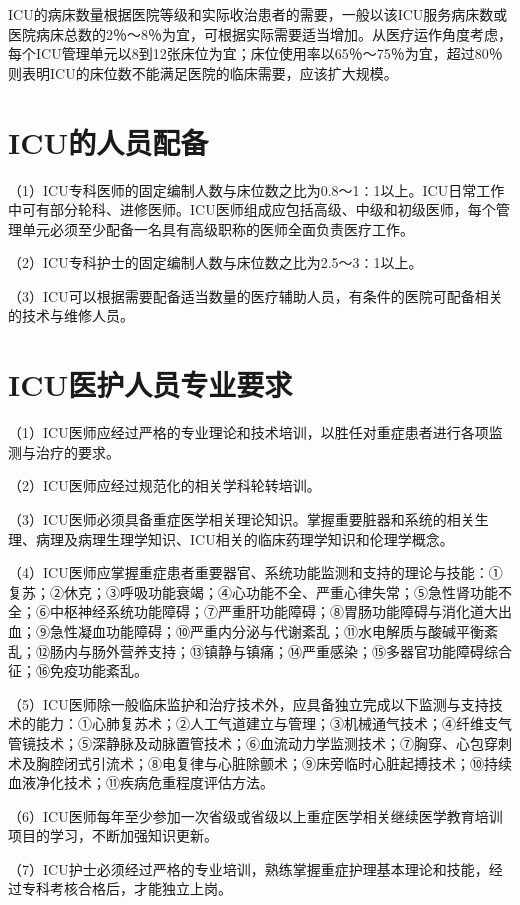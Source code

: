 ICU的病床数量根据医院等级和实际收治患者的需要，一般以该ICU服务病床数或医院病床总数的2％～8％为宜，可根据实际需要适当增加。从医疗运作角度考虑，每个ICU管理单元以8到12张床位为宜；床位使用率以65％～75％为宜，超过80％则表明ICU的床位数不能满足医院的临床需要，应该扩大规模。

\section{ICU的人员配备}

（1）ICU专科医师的固定编制人数与床位数之比为0.8～1∶1以上。ICU日常工作中可有部分轮科、进修医师。ICU医师组成应包括高级、中级和初级医师，每个管理单元必须至少配备一名具有高级职称的医师全面负责医疗工作。

（2）ICU专科护士的固定编制人数与床位数之比为2.5～3∶1以上。

（3）ICU可以根据需要配备适当数量的医疗辅助人员，有条件的医院可配备相关的技术与维修人员。

\section{ICU医护人员专业要求}

（1）ICU医师应经过严格的专业理论和技术培训，以胜任对重症患者进行各项监测与治疗的要求。

（2）ICU医师应经过规范化的相关学科轮转培训。

（3）ICU医师必须具备重症医学相关理论知识。掌握重要脏器和系统的相关生理、病理及病理生理学知识、ICU相关的临床药理学知识和伦理学概念。

（4）ICU医师应掌握重症患者重要器官、系统功能监测和支持的理论与技能：①复苏；②休克；③呼吸功能衰竭；④心功能不全、严重心律失常；⑤急性肾功能不全；⑥中枢神经系统功能障碍；⑦严重肝功能障碍；⑧胃肠功能障碍与消化道大出血；⑨急性凝血功能障碍；⑩严重内分泌与代谢紊乱；⑪水电解质与酸碱平衡紊乱；⑫肠内与肠外营养支持；⑬镇静与镇痛；⑭严重感染；⑮多器官功能障碍综合征；⑯免疫功能紊乱。

（5）ICU医师除一般临床监护和治疗技术外，应具备独立完成以下监测与支持技术的能力：①心肺复苏术；②人工气道建立与管理；③机械通气技术；④纤维支气管镜技术；⑤深静脉及动脉置管技术；⑥血流动力学监测技术；⑦胸穿、心包穿刺术及胸腔闭式引流术；⑧电复律与心脏除颤术；⑨床旁临时心脏起搏技术；⑩持续血液净化技术；⑪疾病危重程度评估方法。

（6）ICU医师每年至少参加一次省级或省级以上重症医学相关继续医学教育培训项目的学习，不断加强知识更新。

（7）ICU护士必须经过严格的专业培训，熟练掌握重症护理基本理论和技能，经过专科考核合格后，才能独立上岗。

